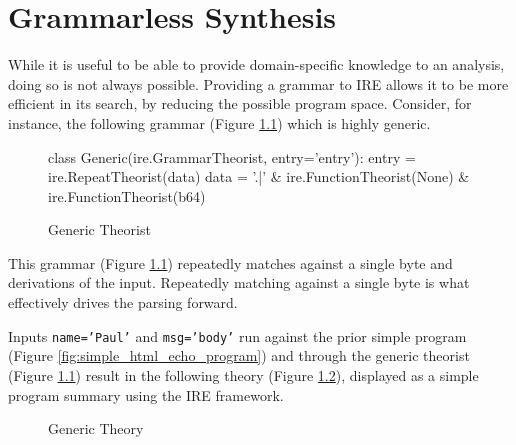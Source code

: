 \chapter{Grammarless Synthesis}

While it is useful to be able to provide domain-specific knowledge to an analysis, doing so is not always possible.
Providing a grammar to IRE allows it to be more efficient in its search, by reducing the possible program space.
Consider, for instance, the following grammar (Figure \ref{fig:generic_theorist}) which is highly generic.

\begin{figure}[H]
\begin{pythoncode}
class Generic(ire.GrammarTheorist, entry='entry'):
    entry = ire.RepeatTheorist(data)
    data = '.|\n' & ire.FunctionTheorist(None) & ire.FunctionTheorist(b64)
\end{pythoncode}
\caption{Generic Theorist}
\label{fig:generic_theorist}
\end{figure}

This grammar (Figure \ref{fig:generic_theorist}) repeatedly matches against a single byte and derivations of the input.
Repeatedly matching against a single byte is what effectively drives the parsing forward.

Inputs \texttt{name='Paul'} and \texttt{msg='body'} run against the prior simple program (Figure \ref{fig:simple_html_echo_program}) and through the generic theorist (Figure \ref{fig:generic_theorist}) result in the following theory (Figure \ref{fig:generic_theory}), displayed as a simple program summary using the IRE framework.

\begin{figure}[H]
\caption{Generic Theory}
\label{fig:generic_theory}
\end{figure}

